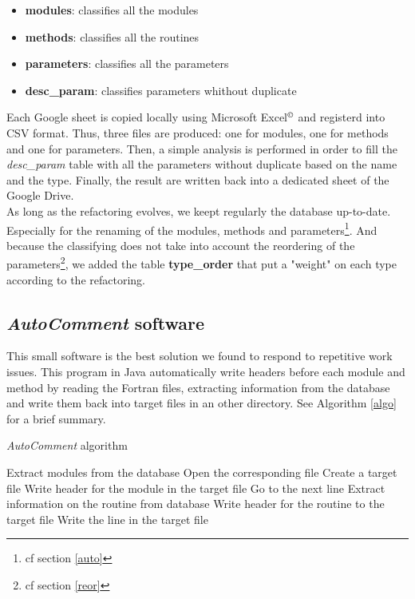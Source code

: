 \begin{itemize}
\item \textbf{modules}: classifies all the modules
\item \textbf{methods}: classifies all the routines
\item \textbf{parameters}: classifies all the parameters
\item \textbf{desc\_param}: classifies parameters whithout duplicate
\end{itemize}
Each Google sheet is copied locally using Microsoft Excel$^\copyright$ and registerd into CSV format. Thus, three files are produced: one for modules, one for methods and one for parameters. Then, a simple analysis is performed in order to fill the \textit{desc\_param} table with all the parameters without duplicate based on the name and the type. Finally, the result are written back into a dedicated sheet of the Google Drive.\\

As long as the refactoring evolves, we keept regularly the database up-to-date. Especially for the renaming of the modules, methods and parameters\footnote{cf section \ref{auto}}. And because the classifying does not take into account the reordering of the parameters\footnote{cf section \ref{reor}}, we added the table \textbf{type\_order} that put a "weight" on each type according to the refactoring.

\subsection{\textit{AutoComment} software\label{auto}}
This small software is the best solution we found to respond to repetitive work issues. This program in Java automatically write headers before each module and method by reading the Fortran files, extracting information from the database and write them back into target files in an other directory. See Algorithm \ref{algo} for a brief summary. 
\begin{algorithm}
\caption{\textit{AutoComment} algorithm}
\label{algo}
\begin{algorithmic}
\State Extract modules from the database
\State Open the corresponding file
\State Create a target file
\State Write header for the module in the target file
			\State Go to the next line
			\State Extract information on the routine from database
			\State Write header for the routine to the target file
		\Else
			\State Write the line in the target file
		\EndIf
	\EndFor
\EndFor
\end{algorithmic}
\end{algorithm}

